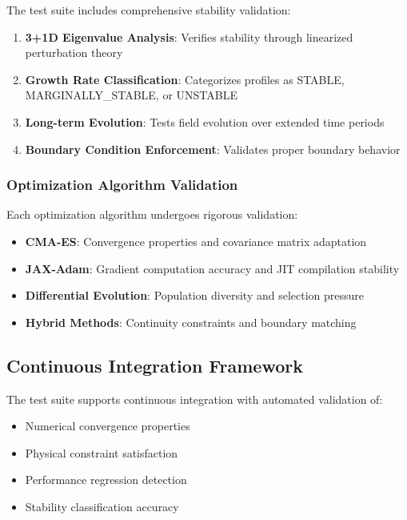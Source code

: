 \documentclass[11pt,a4paper]{article}
\begin{document}
\begin{table}[h]
\begin{table}[h]
The test suite includes comprehensive stability validation:

\begin{enumerate}
\item \textbf{3+1D Eigenvalue Analysis}: Verifies stability through linearized perturbation theory
\item \textbf{Growth Rate Classification}: Categorizes profiles as STABLE, MARGINALLY\_STABLE, or UNSTABLE
\item \textbf{Long-term Evolution}: Tests field evolution over extended time periods
\item \textbf{Boundary Condition Enforcement}: Validates proper boundary behavior
\end{enumerate}

\subsubsection{Optimization Algorithm Validation}

Each optimization algorithm undergoes rigorous validation:

\begin{itemize}
\item \textbf{CMA-ES}: Convergence properties and covariance matrix adaptation
\item \textbf{JAX-Adam}: Gradient computation accuracy and JIT compilation stability  
\item \textbf{Differential Evolution}: Population diversity and selection pressure
\item \textbf{Hybrid Methods}: Continuity constraints and boundary matching
\end{itemize}

\subsection{Continuous Integration Framework}

The test suite supports continuous integration with automated validation of:

\begin{itemize}
\item Numerical convergence properties
\item Physical constraint satisfaction
\item Performance regression detection
\item Stability classification accuracy
\end{itemize}


\end{table}
\end{table}
\end{document}
